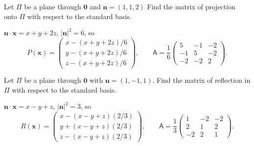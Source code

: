 \documentclass[letter-paper]{tufte-book}
\newenvironment{example}[1][Example]{\begin{trivlist}
\item[\hskip \labelsep {\bfseries #1}]}{\end{trivlist}}
\newcommand{\nb}{\boldsymbol{n}}
\newcommand{\xb}{\boldsymbol{x}}
\begin{document}
\begin{example}
	Let $\Pi$ be a plane through $\boldsymbol{0}$ and $\nb=(1,1,2)$ Find the
	matrix of projection onto $\Pi$ with respect to the standard basis.
	
	$\nb\cdot\xb=x+y+2z$, $|\nb|^2=6$, so
	\begin{equation*}
		P(\xb)=\begin{pmatrix}x-(x+y+2z)/6\\y-(x+y+2z)/6\\
		z-(x+y+2z)/6\end{pmatrix},\qquad \mathsf{A}=\frac{1}{6}\begin{pmatrix}
		5 & -1 & -2 \\ -1 & 5 & -2 \\ -2 & -2 & 2\end{pmatrix}.
	\end{equation*}
\end{example}

\begin{example}
	Let $\Pi$ be a plane through $\boldsymbol{0}$ with $\nb=(1,-1,1)$. Find the
	matrix of reflection in $\Pi$ with respect to the standard basis.
	
	$\nb\cdot\xb=x-y+z$, $|\nb|^2=3$, so
	\begin{equation*}
		R(\xb)=\begin{pmatrix}x-(x-y+z)(2/3)\\y+(x-y+z)(2/3)\\
		z-(x-y+z)(2/3)\end{pmatrix},\qquad \mathsf{A}=\frac{1}{3}\begin{pmatrix}
		1 & -2 & -2 \\ 2 & 1 & 2 \\ -2 & 2 & 1\end{pmatrix}.
	\end{equation*}
\end{example}
\end{document}
